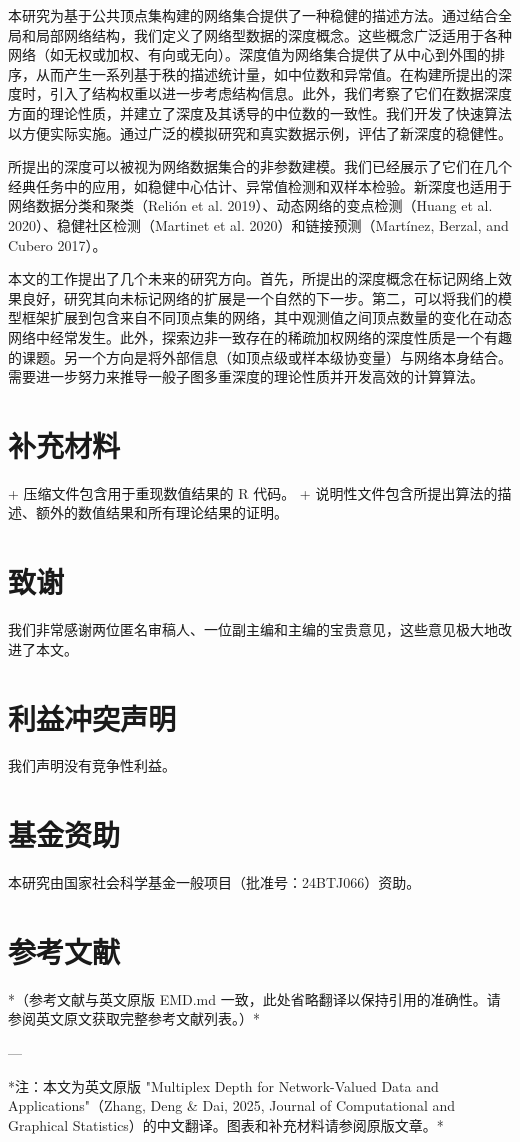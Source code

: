 \documentclass[
  10
]{article}
\begin{document}
本研究为基于公共顶点集构建的网络集合提供了一种稳健的描述方法。通过结合全局和局部网络结构，我们定义了网络型数据的深度概念。这些概念广泛适用于各种网络（如无权或加权、有向或无向）。深度值为网络集合提供了从中心到外围的排序，从而产生一系列基于秩的描述统计量，如中位数和异常值。在构建所提出的深度时，引入了结构权重以进一步考虑结构信息。此外，我们考察了它们在数据深度方面的理论性质，并建立了深度及其诱导的中位数的一致性。我们开发了快速算法以方便实际实施。通过广泛的模拟研究和真实数据示例，评估了新深度的稳健性。

所提出的深度可以被视为网络数据集合的非参数建模。我们已经展示了它们在几个经典任务中的应用，如稳健中心估计、异常值检测和双样本检验。新深度也适用于网络数据分类和聚类（Relión et al. 2019）、动态网络的变点检测（Huang et al. 2020）、稳健社区检测（Martinet et al. 2020）和链接预测（Martínez, Berzal, and Cubero 2017）。

本文的工作提出了几个未来的研究方向。首先，所提出的深度概念在标记网络上效果良好，研究其向未标记网络的扩展是一个自然的下一步。第二，可以将我们的模型框架扩展到包含来自不同顶点集的网络，其中观测值之间顶点数量的变化在动态网络中经常发生。此外，探索边非一致存在的稀疏加权网络的深度性质是一个有趣的课题。另一个方向是将外部信息（如顶点级或样本级协变量）与网络本身结合。需要进一步努力来推导一般子图多重深度的理论性质并开发高效的计算算法。

\section{补充材料}

+ 压缩文件包含用于重现数值结果的 R 代码。
+ 说明性文件包含所提出算法的描述、额外的数值结果和所有理论结果的证明。

\section{致谢}

我们非常感谢两位匿名审稿人、一位副主编和主编的宝贵意见，这些意见极大地改进了本文。

\section{利益冲突声明}

我们声明没有竞争性利益。

\section{基金资助}

本研究由国家社会科学基金一般项目（批准号：24BTJ066）资助。

\section{参考文献}

*（参考文献与英文原版 EMD.md 一致，此处省略翻译以保持引用的准确性。请参阅英文原文获取完整参考文献列表。）*

---

*注：本文为英文原版 "Multiplex Depth for Network-Valued Data and Applications"（Zhang, Deng \& Dai, 2025, Journal of Computational and Graphical Statistics）的中文翻译。图表和补充材料请参阅原版文章。*
\end{document}
